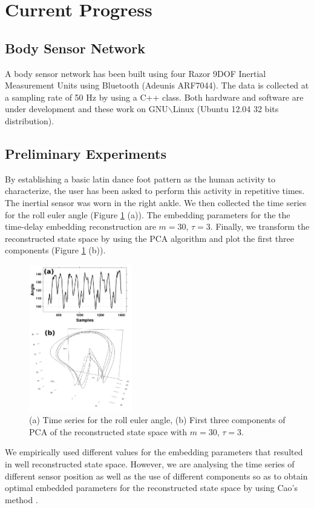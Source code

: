 \documentclass{sigchi}
\begin{document}
\section{Current Progress}

\subsection{Body Sensor Network}
A body sensor network has been built using four Razor 9DOF Inertial Measurement 
Units using Bluetooth (Adeunis ARF7044).
The data is collected at a sampling rate of 50 Hz by using a C++ class. 
Both hardware and software are under development and these work on 
GNU$\backslash$Linux (Ubuntu 12.04 32 bits distribution).

\subsection{Preliminary Experiments}
By establishing a basic latin dance foot pattern as the human activity to characterize,
the user has been asked to perform this activity in repetitive times. 
The inertial sensor was worn in the right ankle.
We then collected the time series for the roll euler angle 
(Figure \ref{fig:example} (a)). 
The embedding parameters for the the time-delay embedding reconstruction 
are $m=30$, $\tau=3$. Finally, we transform the reconstructed state space
by using the PCA algorithm and plot the first three components
(Figure \ref{fig:example} (b)).
\begin{figure}[htbp!] 
\centering    
\includegraphics[width=0.4\textwidth]{experiments_v0}
\caption[PA]{(a) Time series for the roll euler angle, (b) 
First three components of PCA of the reconstructed state space with $m=30$, $\tau=3$.}
\label{fig:example}
\end{figure}
We empirically used different values for the embedding parameters 
that resulted in well reconstructed state space.
However, we are analysing the time series of different sensor position as well as 
the use of different components so as to obtain optimal embedded parameters
for the reconstructed state space by using Cao's method \cite{Cao1997}.
\end{document}
